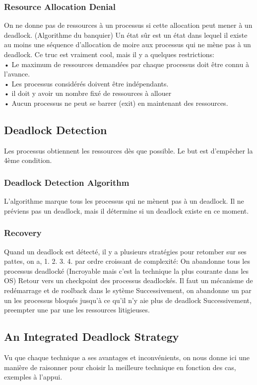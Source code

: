 \subsubsection{Resource Allocation Denial}
On ne donne pas de ressources à un processus si cette allocation peut mener à un deadlock. (Algorithme du banquier)
Un état sûr est un état dans lequel il existe au moins une séquence d’allocation de moire aux processus qui ne mène pas à un deadlock. Ce truc est vraiment cool, mais il y a quelques restrictions:\\
• Le maximum de ressources demandées par chaque processus doit être connu à l’avance.\\
• Les processus considérés doivent être indépendants.\\
• il doit y avoir un nombre fixé de ressources à allouer\\
• Aucun processus ne peut se barrer (exit) en maintenant des ressources.\\
\subsection{Deadlock Detection}
Les processus obtiennent les ressources dès que possible. Le but est d’empêcher la 4ème condition.
\subsubsection{Deadlock Detection Algorithm}
L’algorithme marque tous les processus qui ne mènent pas à un deadlock. Il ne préviens pas un deadlock, mais il détermine si un deadlock existe en ce moment.
\subsubsection{Recovery}
Quand un deadlock est détecté, il y a plusieurs stratégies pour retomber sur ses pattes,
on a, 1.
2. 3. 4.
par ordre croissant de complexité:
On abandonne tous les processus deadlocké (Incroyable mais c’est la technique la plus courante dans les OS)
Retour vers un checkpoint des processus deadlockés. Il faut un mécanisme de redémarrage et de roolback dans le sytème
Successivement, on abandonne un par un les processus bloqués jusqu’à ce qu’il n’y aie plus de deadlock
Successivement, preempter une par une les ressources litigieuses.
\subsection{An Integrated Deadlock Strategy}
Vu que chaque technique a ses avantages et inconvénients, on nous donne ici une manière de raisonner pour choisir la meilleure technique en fonction des cas, exemples à l’appui.
